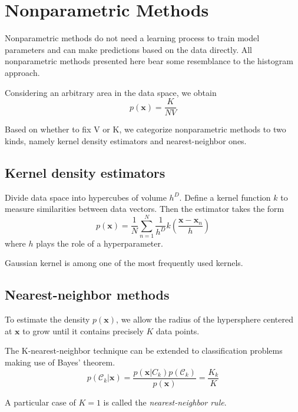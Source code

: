 \documentclass[a4paper]{report}
\renewcommand{\bf}{\mathbf}
\renewcommand{\cal}{\mathcal}
\begin{document}
\section{Nonparametric Methods}
Nonparametric methods do not need a learning process to train model parameters and can make predictions based on the data directly. All nonparametric methods presented here bear some resemblance to the histogram approach.

Considering an arbitrary area in the data space, we obtain
\begin{equation}
	p(\bf{x}) =\frac{K}{NV}
\end{equation}

Based on whether to fix V or K, we categorize nonparametric methods to two kinds, namely kernel density estimators and nearest-neighbor ones.
\subsection{Kernel density estimators}
Divide data space into hypercubes of volume $h^{D}$. Define a kernel function $k$ to measure similarities between data vectors. Then the estimator takes the form
\begin{equation}
	p(\bf{x}) = \frac{1}{N} \sum_{n=1}^{N} \frac{1}{h^{D}}k(\frac{\bf{x-x}_n}{h})
\end{equation}
where $h$ plays the role of a hyperparameter.

Gaussian kernel is among one of the most frequently used kernels.
\subsection{Nearest-neighbor methods}
To estimate the density $p(\bf{x})$, we allow the radius of the hypersphere centered at $\bf{x}$ to grow until it contains precisely $K$ data points.

The K-nearest-neighbor technique can be extended to classification problems making use of Bayes' theorem.
\begin{equation}
	p(\cal{C}_k|\bf{x})=\frac{p(\bf{x}|C_k)p(\cal{C}_k)}{p(\bf{x})}=\frac{K_k}{K}
\end{equation}

A particular case of $K=1$ is called the \emph{nearest-neighbor rule}.
\end{document}
